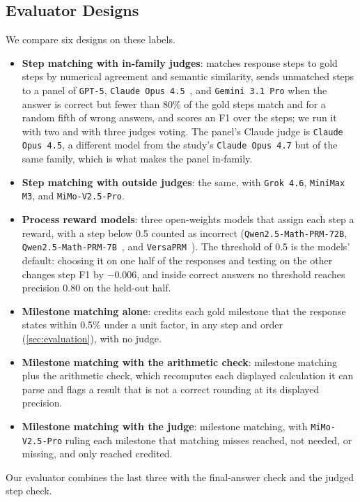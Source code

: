 \subsection{Evaluator Designs}

We compare six designs on these labels.
\begin{itemize}
    \item \textbf{Step matching with in-family judges}: matches response steps to gold steps by
    numerical agreement and semantic similarity, sends unmatched steps to a panel of \texttt{GPT-5},
    \texttt{Claude Opus 4.5}~\citep{claudeopus45}, and \texttt{Gemini 3.1 Pro} when the answer is
    correct but fewer than 80\% of the gold steps match and for a random fifth of wrong answers, and
    scores an F1 over the steps; we run it with two and with three judges voting.
    The panel's Claude judge is \texttt{Claude Opus 4.5}, a different model from the study's
    \texttt{Claude Opus 4.7} but of the same family, which is what makes the panel in-family.
    \item \textbf{Step matching with outside judges}: the same, with \texttt{Grok 4.6},
    \texttt{MiniMax M3}, and \texttt{MiMo-V2.5-Pro}.
    \item \textbf{Process reward models}: three open-weights models that assign each step a reward,
    with a step below 0.5 counted as incorrect (\texttt{Qwen2.5-Math-PRM-72B},
    \texttt{Qwen2.5-Math-PRM-7B}~\citep{zhang2025prmlessons}, and
    \texttt{VersaPRM}~\citep{zeng2025versaprm}).
    The threshold of 0.5 is the models' default: choosing it on one half of the responses and
    testing on the other changes step F1 by $-0.006$, and inside correct answers no threshold
    reaches precision 0.80 on the held-out half.
    \item \textbf{Milestone matching alone}: credits each gold milestone that the response states
    within 0.5\% under a unit factor, in any step and order (\autoref{sec:evaluation}), with no
    judge.
    \item \textbf{Milestone matching with the arithmetic check}: milestone matching plus the
    arithmetic check, which recomputes each displayed calculation it can parse and flags a result
    that is not a correct rounding at its displayed precision.
    \item \textbf{Milestone matching with the judge}: milestone matching, with
    \texttt{MiMo-V2.5-Pro} ruling each milestone that matching misses reached, not needed, or
    missing, and only reached credited.
\end{itemize}
Our evaluator combines the last three with the final-answer check and the judged step check.

